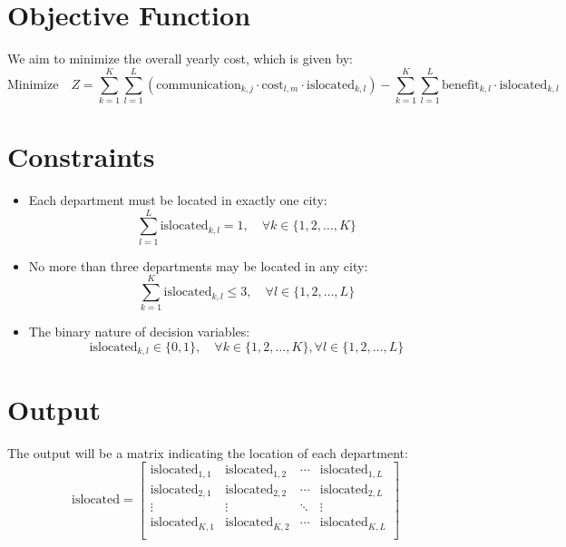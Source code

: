 \documentclass{article}
\begin{document}
\section*{Objective Function}
We aim to minimize the overall yearly cost, which is given by:
\[
\text{Minimize} \quad Z = \sum_{k=1}^{K} \sum_{l=1}^{L} \left( \text{communication}_{k,j} \cdot \text{cost}_{l,m} \cdot \text{islocated}_{k,l} \right) - \sum_{k=1}^{K} \sum_{l=1}^{L} \text{benefit}_{k,l} \cdot \text{islocated}_{k,l}
\]

\section*{Constraints}
\begin{itemize}
    \item Each department must be located in exactly one city:
    \[
    \sum_{l=1}^{L} \text{islocated}_{k,l} = 1, \quad \forall k \in \{1, 2, \ldots, K\}
    \]
    
    \item No more than three departments may be located in any city:
    \[
    \sum_{k=1}^{K} \text{islocated}_{k,l} \leq 3, \quad \forall l \in \{1, 2, \ldots, L\}
    \]
    
    \item The binary nature of decision variables:
    \[
    \text{islocated}_{k,l} \in \{0, 1\}, \quad \forall k \in \{1, 2, \ldots, K\}, \forall l \in \{1, 2, \ldots, L\}
    \]
\end{itemize}

\section*{Output}
The output will be a matrix indicating the location of each department:
\[
\text{islocated} = \begin{bmatrix}
\text{islocated}_{1,1} & \text{islocated}_{1,2} & \cdots & \text{islocated}_{1,L} \\
\text{islocated}_{2,1} & \text{islocated}_{2,2} & \cdots & \text{islocated}_{2,L} \\
\vdots & \vdots & \ddots & \vdots \\
\text{islocated}_{K,1} & \text{islocated}_{K,2} & \cdots & \text{islocated}_{K,L} \\
\end{bmatrix}
\]
\end{document}
